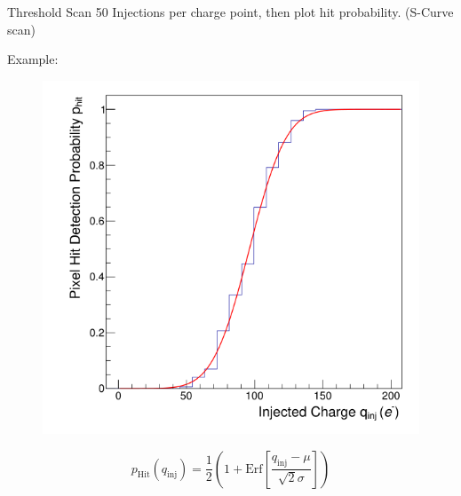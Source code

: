 \documentclass{beamer}
\begin{document}
\begin{frame}{Threshold Scan}
    50 Injections per charge point, then plot hit probability. (S-Curve scan)\\[.5cm]
    \begin{minipage}{.49\textwidth}
	\centering
	Example:
	\begin{figure}[H]
	    \centering
	    \includegraphics[width=\textwidth]{s-curve.png}
	\end{figure}
    \end{minipage}
    \begin{minipage}{.49\textwidth}
	\[ 
	   p _{\text{Hit}} (q _{\text{inj}}) = \frac{1}{2} \left(
	       1 + \text{Erf} \left[ \frac{q _{\text{inj}} - \mu}{\sqrt{2} \sigma} 
	       \right] \right)
       \]
    \end{minipage}
\end{frame}
\end{document}

